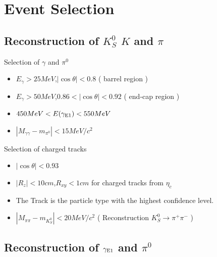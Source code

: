 \documentclass{beamer}
\begin{document}
\section{Event Selection}
\subsection{Reconstruction of $K_S^0$ $K$ and $\pi$}

\begin{frame}{}
\begin{block}{Selection of $\gamma$ and ${\pi}^0$}
\begin{itemize}
\item $E_{\gamma}>25 MeV$,$|\cos\theta|<0.8$ ( barrel region )
\item $E_{\gamma}>50 MeV$,$0.86<|\cos\theta|<0.92$ ( end-cap region )
\item $450MeV < E({\gamma}_{{\rm E1}}) < 550MeV$
\item $|M_{\gamma \gamma}-m_{{\pi}^0}| < 15 MeV/c^2$
\end{itemize}
\end{block}
\begin{block}{Selection of charged tracks}
\begin{itemize}
\item $ | \cos\theta |<0.93$
\item $|R_{z}|<10cm$,$R_{xy}<1cm$ for charged tracks from ${\eta}_c$
\item The Track is the particle type with the highest confidence level.
\item $ |M_{\pi \pi} - m_{K_S^0} | < 20 MeV/c^2$ ( Reconstruction $K_S^0 \rightarrow {\pi}^+ {\pi}^-$ )
\end{itemize}
\end{block}
\end{frame}
\subsection{Reconstruction of ${\gamma}_{\rm E1}$ and ${\pi}^0$}
\end{document}
